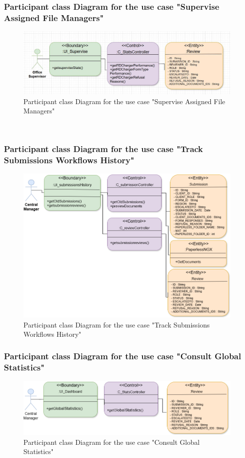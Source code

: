 \subsubsection{Participant class Diagram for the use case "Supervise Assigned File Managers"}
\begin{figure}[h!]
    \centering
    \includegraphics[width=1\textwidth]{figures/dc supervise assigned file managers activities.JPG}
    \caption{Participant class Diagram for the use case "Supervise Assigned File Managers"}
\end{figure}\
\clearpage
\subsubsection{Participant class Diagram for the use case "Track Submissions Workflows History"}
\begin{figure}[h!]
    \centering
    \includegraphics[width=1\textwidth]{figures/dc Track submissions Workflows history.png}
    \caption{Participant class Diagram for the use case "Track Submissions Workflows History"}
\end{figure}
\subsubsection{Participant class Diagram for the use case "Consult Global Statistics"}
\begin{figure}[h!]
    \centering
    \includegraphics[width=1\textwidth]{figures/dc Consult global statistics.png}
    \caption{Participant class Diagram for the use case "Consult Global Statistics"}
\end{figure}
\clearpage
